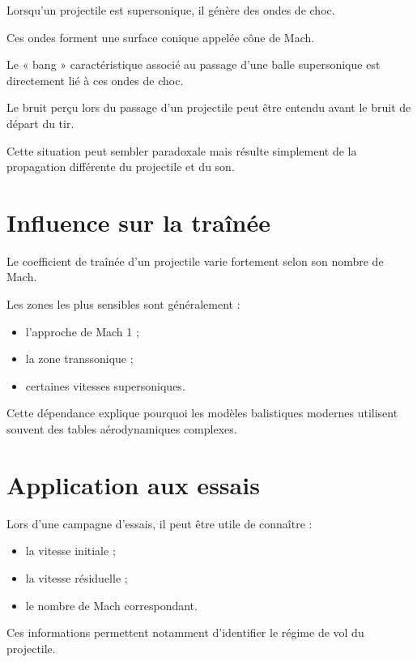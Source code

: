 Lorsqu'un projectile est supersonique, il génère des ondes de choc.

Ces ondes forment une surface conique appelée cône de Mach.

Le « bang » caractéristique associé au passage d'une balle supersonique est
directement lié à ces ondes de choc.

\begin{exemple}

Le bruit perçu lors du passage d'un projectile peut être entendu avant le
bruit de départ du tir.

Cette situation peut sembler paradoxale mais résulte simplement de la
propagation différente du projectile et du son.

\end{exemple}

\section{Influence sur la traînée}

Le coefficient de traînée d'un projectile varie fortement selon son nombre
de Mach.

Les zones les plus sensibles sont généralement :

\begin{itemize}
\item l'approche de Mach 1 ;
\item la zone transsonique ;
\item certaines vitesses supersoniques.
\end{itemize}

Cette dépendance explique pourquoi les modèles balistiques modernes utilisent
souvent des tables aérodynamiques complexes.

\section{Application aux essais}

Lors d'une campagne d'essais, il peut être utile de connaître :

\begin{itemize}
\item la vitesse initiale ;
\item la vitesse résiduelle ;
\item le nombre de Mach correspondant.
\end{itemize}

Ces informations permettent notamment d'identifier le régime de vol du
projectile.

